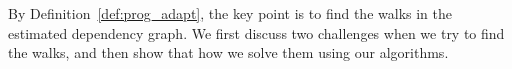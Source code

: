By Definition~\ref{def:prog_adapt}, the key point is to find the walks in the estimated dependency graph. 
We first discuss two challenges when we try to find the walks,
and then show that how we solve them using our algorithms.

